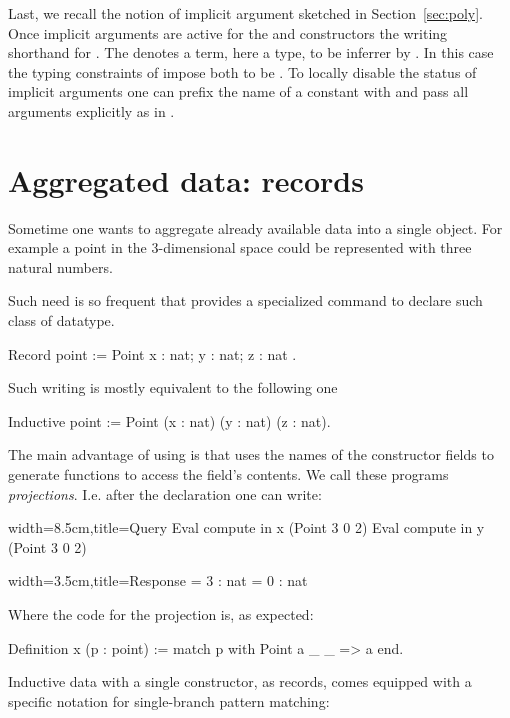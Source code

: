 Last, we recall the notion of implicit argument sketched in
Section~\ref{sec:poly}.  Once implicit arguments are active for
the  and  constructors the writing  
shorthand for .  The \C{_} denotes a term,
here a type, to be inferrer by \Coq{}.  In this case the typing constraints
of impose both \C{_} to be .  To locally disable the
status of implicit arguments one can prefix the name of a
constant with  and pass all arguments explicitly as in
.

\section{Aggregated data: records}

Sometime one wants to aggregate already available data into a single object.
For example a point in the 3-dimensional space could be represented with
three natural numbers.

Such need is so frequent that \Coq{} provides a specialized command
to declare such class of datatype.

\begin{coq}{}{}
Record point := Point { x : nat; y : nat; z : nat }.
\end{coq}
Such writing is mostly equivalent to the following one

\begin{coq}{}{}
Inductive point := Point (x : nat) (y : nat) (z : nat).
\end{coq}

The main advantage of using  is that \Coq{} uses the names of the
constructor fields to generate functions to access the field's contents.  We
call these programs \emph{projections}.  I.e. after the  declaration
one can write:

\begin{coq}{}{width=8.5cm,title=Query}
Eval compute in x (Point 3 0 2)
Eval compute in y (Point 3 0 2)
\end{coq}{}{}
\begin{coqout}{}{width=3.5cm,title=Response}
= 3 : nat
= 0 : nat
\end{coqout}{}{}
Where the code for the  projection is, as expected:

\begin{coq}{}{}
Definition x (p : point) := match p with Point a _ _ => a end.
\end{coq}
Inductive data with a single constructor, as records, comes
equipped with a specific notation for single-branch pattern
matching:

